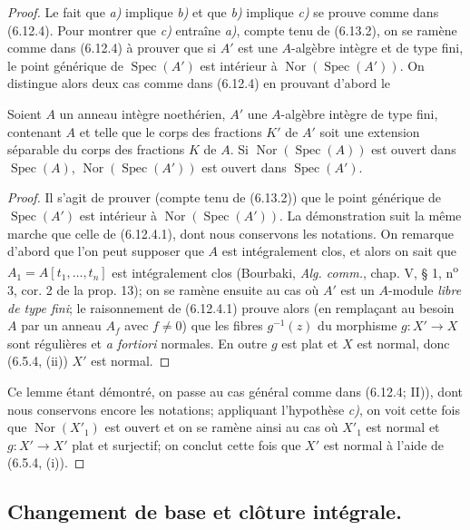 \begin{proof}
Le fait que \emph{a)} implique \emph{b)} et que \emph{b)} implique \emph{c)} se prouve comme dans
(6.12.4). Pour montrer que \emph{c)} entraîne \emph{a)}, compte tenu de (6.13.2), on se
ramène comme dans (6.12.4) à prouver que si $A'$ est une $A$-algèbre intègre
et de type fini, le point générique de $\operatorname{Spec}(A')$ est
intérieur à $\operatorname{Nor}(\operatorname{Spec}(A'))$. On distingue
alors deux cas comme dans (6.12.4) en prouvant d'abord le

\begin{lemma}[6.13.7.1]
\label{IV.2.s6.13.7.1-fr}
Soient $A$ un anneau intègre noethérien, $A'$ une $A$-algèbre intègre de
type fini, contenant $A$ et telle que le corps des fractions $K'$ de $A'$
soit une extension séparable du corps des fractions $K$ de $A$. Si
$\operatorname{Nor}(\operatorname{Spec}(A))$ est ouvert dans
$\operatorname{Spec}(A)$, $\operatorname{Nor}(\operatorname{Spec}(A'))$ est
ouvert dans $\operatorname{Spec}(A')$.
\end{lemma}

\begin{proof}
Il s'agit de prouver (compte tenu de (6.13.2)) que le point générique de
$\operatorname{Spec}(A')$ est intérieur à
$\operatorname{Nor}(\operatorname{Spec}(A'))$. La démonstration suit la
même marche que celle de (6.12.4.1), dont nous conservons les notations. On
remarque d'abord que l'on peut supposer que $A$ est intégralement clos, et
alors on sait que $A_1=A[t_1,\ldots,t_n]$ est intégralement clos (Bourbaki,
\emph{Alg. comm.}, chap. V, § 1, n\textsuperscript{o} 3, cor. 2 de la prop. 13); on se ramène
ensuite au cas où $A'$ est un $A$-module \emph{libre de type fini}; le raisonnement
de (6.12.4.1) prouve alors (en remplaçant au besoin $A$ par un anneau $A_f$
avec $f\neq0$) que les fibres $g^{-1}(z)$ du morphisme $g:X'\to X$ sont
régulières et \emph{a fortiori} normales. En outre $g$ est plat et $X$ est normal,
donc (6.5.4, (ii)) $X'$ est normal.
\end{proof}

Ce lemme étant démontré, on passe au cas général comme dans (6.12.4; II)),
dont nous conservons encore les notations; appliquant l'hypothèse \emph{c)}, on
voit cette fois que $\operatorname{Nor}(X'_1)$ est ouvert et on se ramène
ainsi au cas où $X'_1$ est normal et $g:X'\to X'$ plat et surjectif; on
conclut cette fois que $X'$ est normal à l'aide de (6.5.4, (i)).
\end{proof}

\subsection{Changement de base et clôture intégrale.}
\label{IV.2.s6.14-fr}

